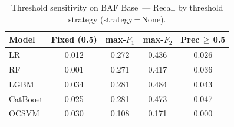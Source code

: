 \begin{table}[ht]
\centering
\caption{Threshold sensitivity on BAF Base~--- Recall by threshold strategy (strategy\,=\,None).}
\label{tab:threshold_baf_recall}
\begin{tabular}{l c c c c}
\toprule
Model & Fixed (0.5) & max-$F_1$ & max-$F_2$ & Prec\,$\geq$\,0.5 \\
\midrule
LR         & 0.012 & 0.272 & 0.436 & 0.026 \\
RF         & 0.001 & 0.271 & 0.417 & 0.036 \\
LGBM       & 0.034 & 0.281 & 0.484 & 0.043 \\
CatBoost   & 0.025 & 0.281 & 0.473 & 0.047 \\
OCSVM      & 0.030 & 0.108 & 0.171 & 0.000 \\
\bottomrule
\end{tabular}
\end{table}